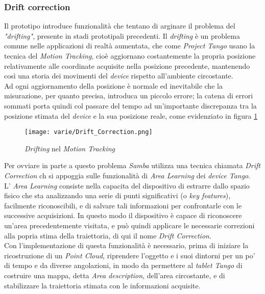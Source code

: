 \subsubsection{Drift correction}
Il prototipo introduce funzionalità che tentano di arginare il problema del \emph{"drifting"}, presente in stadi prototipali precedenti. Il \emph{drifting} è un problema comune nelle applicazioni di realtà aumentata, che come \emph{Project Tango} usano la tecnica del \emph{Motion Tracking}, cioè aggiornano costantemente la propria posizione relativamente alle coordinate acquisite nella posizione precedente, mantenendo così una storia dei movimenti del \emph{device} rispetto all'ambiente circostante.\\
Ad ogni aggiornamento della posizione è normale ed inevitabile che la misurazione, per quanto precisa, introduca un piccolo errore; la catena di errori sommati porta quindi col passare del tempo ad un'importante discrepanza tra la posizione stimata del \emph{device} e la sua posizione reale, come evidenziato in figura \ref{fig:drift_correction}
\begin{figure}[!h] 
    \centering 
    \texttt{[image: varie/Drift\_Correction.png]} 
    \caption{\emph{Drifting} nel \emph{Motion Tracking}}
    \label{fig:drift_correction}
\end{figure}
\newline
Per ovviare in parte a questo problema \emph{Samba} utilizza una tecnica chiamata \emph{Drift Correction} ch si appoggia sulle funzionalità di \emph{Area Learning} dei \emph{device Tango}.\\
L' \emph{Area Learning} consiste nella capacita del dispositivo di estrarre dallo spazio fisico che sta analizzando una serie di punti significativi (o \emph{key features}), facilmente riconoscibili, e di salvare tali informazioni per confrontarle con le successive acquisizioni. In questo modo il dispositivo è capace di riconoscere un'area precedentemente visitata, e può quindi applicare le necessarie correzioni alla popria stima della traiettoria, di qui il nome \emph{Drift Correction}.\\
Con l'implementazione di questa funzionalità è necessario, prima di iniziare la ricostruzione di un \emph{Point Cloud}, riprendere l'oggetto e i suoi dintorni per un po' di tempo e da diverse angolazioni, in modo da permettere al \emph{tablet Tango} di costruire una mappa, detta \emph{Area description}, dell'area circostante, e di stabilizzare la traiettoria stimata con le informazioni acquisite.\\
